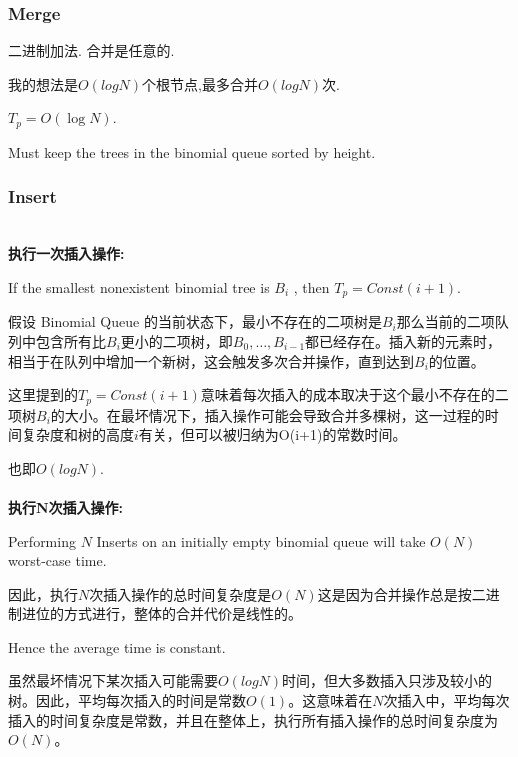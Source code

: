 \documentclass{article}
\begin{document}
\subsubsection{Merge}
二进制加法. 合并是任意的.\par
我的想法是$O(log N)$个根节点,最多合并$O(log N)$次. \par
$T_p=O(\log N)$. \par
Must keep the trees in the binomial queue sorted by height.

\subsubsection{Insert}
\hspace*{\fill}\\
\textbf{执行一次插入操作:}\par
If the smallest nonexistent binomial tree is $B_i$ , then $T_p=Const(i+1)$.
\\\hspace*{\fill}\par
假设 Binomial Queue 的当前状态下，最小不存在的二项树是$B_i$那么当前的二项队列中包含所有比$B_i$更小的二项树，即$B_0,\dots,B_{i-1}$都已经存在。插入新的元素时，相当于在队列中增加一个新树，这会触发多次合并操作，直到达到$B_i$的位置。\par
这里提到的$T_p=Const(i+1)$意味着每次插入的成本取决于这个最小不存在的二项树$B_i$的大小。在最坏情况下，插入操作可能会导致合并多棵树，这一过程的时间复杂度和树的高度$i$有关，但可以被归纳为O(i+1)的常数时间。\par
也即$O(log N)$.
\\\hspace*{\fill}\\
\textbf{执行N次插入操作:}\par
Performing $N$ Inserts on an initially empty binomial queue will take $O(N)$ worst-case time.
\\\hspace*{\fill}\par
因此，执行$N$次插入操作的总时间复杂度是$O(N)$这是因为合并操作总是按二进制进位的方式进行，整体的合并代价是线性的。
\\\hspace*{\fill}\par
Hence the average time is constant.
\\\hspace*{\fill}\par
虽然最坏情况下某次插入可能需要$O(log N)$时间，但大多数插入只涉及较小的树。因此，平均每次插入的时间是常数$O(1)$。这意味着在$N$次插入中，平均每次插入的时间复杂度是常数，并且在整体上，执行所有插入操作的总时间复杂度为$O(N)$。\par
\end{document}
